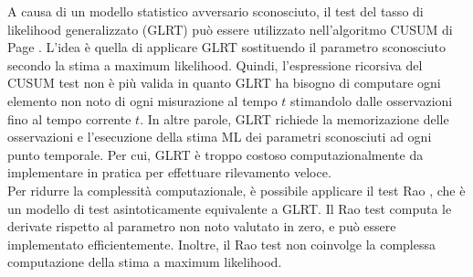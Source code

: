 A causa di un modello statistico avversario sconosciuto, il test del tasso di likelihood generalizzato (GLRT) può essere utilizzato nell'algoritmo CUSUM di Page \cite{lorden}. L'idea è quella di applicare GLRT sostituendo il parametro sconosciuto secondo la stima a maximum likelihood. Quindi, l'espressione ricorsiva del CUSUM test non è più valida in quanto GLRT ha bisogno di computare ogni elemento non noto di ogni misurazione al tempo $t$ stimandolo dalle osservazioni fino al tempo corrente $t$. In altre parole, GLRT richiede la memorizazione delle osservazioni e l'esecuzione della stima ML dei parametri sconosciuti ad ogni punto temporale. Per cui, GLRT è troppo costoso computazionalmente da implementare in pratica per effettuare rilevamento veloce.\\
Per ridurre la complessità computazionale, è possibile applicare il test Rao \cite{lorden}, che è un modello di test asintoticamente equivalente a GLRT. Il Rao test computa le derivate rispetto al parametro non noto valutato in zero, e può essere implementato efficientemente. Inoltre, il Rao test non coinvolge la complessa computazione della stima a maximum likelihood.\\
